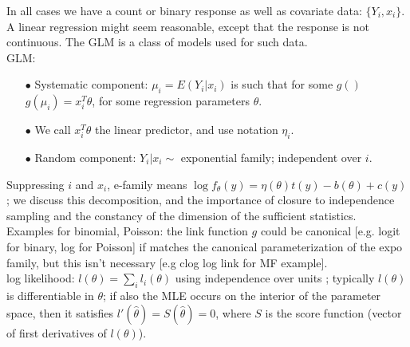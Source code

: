 \documentclass[11pt,a4paper]{article}
\begin{document}
In all cases we have a count or binary response as well as covariate data: $\{Y_i, x_i\}$.  A linear regression might seem reasonable, except that the response is not continuous.  The GLM is a class of models used for such data.\\
GLM:
\begin{itemize}
\item[$\bullet$] Systematic component: $\mu_i = E(Y_i | x_i)$ is such that for some $g()$   $g( \mu_i ) = x_i^T \theta$, for some regression parameters $\theta$.
\item[$\bullet$] We call $x_i^T \theta$ the linear predictor, and use notation $\eta_i$.
\item[$\bullet$] Random component: $Y_i | x_i \sim$ exponential family; independent over $i$.
\end{itemize}
Suppressing $i$ and $x_i$,   e-family means  $\log f_\theta(y)  = \eta(\theta) t(y) - b(\theta) + c(y)$; we discuss this decomposition, and the importance of closure to independence sampling and the constancy of the dimension of the sufficient statistics.\\
Examples for binomial, Poisson: the link function $g$ could be canonical [e.g. logit for binary, log for Poisson] if matches the canonical parameterization of the expo family, but this isn't necessary [e.g clog log link for MF example].\\
log likelihood:   $l(\theta) = \sum_i l_i (\theta)$   using independence over units  ;  typically $l(\theta)$ is differentiable in $\theta$; if also the MLE occurs on the interior of the parameter space, then it satisfies $l'(\hat{\theta}) = S(\hat{\theta}) = 0$, where $S$ is the score function (vector of first derivatives of $l(\theta)$).\\
\end{document}
